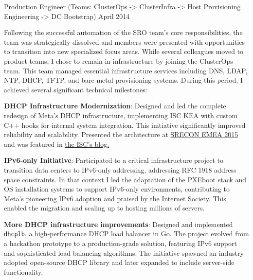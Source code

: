 \begin{cventries}
  \cventryprevrole
  {Production Engineer (Teams: ClusterOps -> ClusterInfra -> Host Provisioning Engineering -> DC Bootstrap)}
  {April 2014 }
  {
    Following the successful automation of the SRO team's core responsibilities, the team was strategically dissolved and
    members were presented with opportunities to transition into new specialized focus areas.
    While several colleagues moved to product teams, I chose to remain in infrastructure by joining the ClusterOps team.
    This team managed essential infrastructure services including DNS, LDAP, NTP, DHCP, TFTP, and bare metal provisioning systems.
    During this period, I achieved several significant technical milestones:
    \vspace{2mm}
    \begin{cvitems}
      \item {\textbf{DHCP Infrastructure Modernization}: Designed and led the complete redesign of Meta's DHCP infrastructure,
                  implementing ISC KEA with custom C++ hooks for internal system integration. This initiative
                  significantly improved reliability and scalability. Presented the architecture at \href{https://www.usenix.org/conference/srecon15europe/program/presentation/failla}{SRECON EMEA 2015}
                  and was featured in \href{https://www.isc.org/blogs/how-facebook-is-using-kea-in-the-datacenter/}{the ISC's blog.}}
      \item {\textbf{IPv6-only Initiative}: Participated to a critical infrastructure project to transition
                  data centers to IPv6-only addressing, addressing RFC 1918 address space constraints. In that context I led the
                  adaptation of the PXEboot stack and OS installation systems to support IPv6-only environments, contributing
                  to Meta's pioneering IPv6 adoption \href{https://www.internetsociety.org/resources/deploy360/2014/case-study-facebook-moving-to-an-ipv6-only-internal-network/}{and praised by the Internet Society}.
                  This enabled the migration and scaling up to hosting millions of servers.}
      \item {\textbf{More DHCP infrastructure improvements}: Designed and implemented \texttt{dhcplb}, a high-performance
                  DHCP load balancer in Go. The project evolved from a hackathon prototype to a production-grade
                  solution, featuring IPv6 support and sophisticated load balancing algorithms. The initiative spawned
                  an industry-adopted open-source DHCP library and later expanded to include server-side functionality,
}
\end{cvitems}}
\end{cventries}
